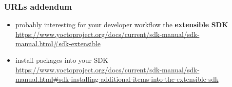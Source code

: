 \begin{frame}
\frametitle{URLs addendum}
  \begin{itemize}
     \item probably interesting for your developer workflow the {\bf extensible SDK}
        \url{https://www.yoctoproject.org/docs/current/sdk-manual/sdk-manual.html\#sdk-extensible}
     \item install packages into your SDK \url{https://www.yoctoproject.org/docs/current/sdk-manual/sdk-manual.html\#sdk-installing-additional-items-into-the-extensible-sdk}
  \end{itemize}
\end{frame}


